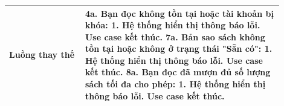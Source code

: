 \begin{table}[H]
\begin{tabular}{|>{\raggedright\arraybackslash}p{0.25\linewidth}|>{\raggedright\arraybackslash}p{0.65\linewidth}|}
\hline
\textbf{Luồng thay thế} &
\textbf{4a. Bạn đọc không tồn tại hoặc tài khoản bị khóa:} \newline
\hspace{1em} 1. Hệ thống hiển thị thông báo lỗi. Use case kết thúc. \newline
\textbf{7a. Bản sao sách không tồn tại hoặc không ở trạng thái "Sẵn có":} \newline
\hspace{1em} 1. Hệ thống hiển thị thông báo lỗi. Use case kết thúc. \newline
\textbf{8a. Bạn đọc đã mượn đủ số lượng sách tối đa cho phép:} \newline
\hspace{1em} 1. Hệ thống hiển thị thông báo lỗi. Use case kết thúc. \\
\hline
\end{tabular}
\end{table}

